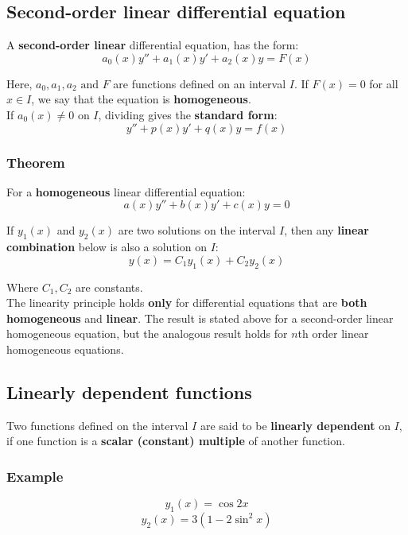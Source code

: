 \documentclass[11pt]{article}
\begin{document}
\newpage

\subsection{Second-order linear differential equation}
\label{sec:org2d5abe5}
A \textbf{second-order linear} differential equation, has the form:
\[a_0(x)y'' + a_1(x)y' + a_2(x)y = F(x)\]

Here, \(a_0, a_1, a_2 \text{ and } F\) are functions defined on an interval \(I\). If \(F(x) = 0\) for all \(x \in I\), we say that the equation is \textbf{homogeneous}.
\\[0pt]

If \(a_0 (x) \ne 0\) on \(I\), dividing gives the \textbf{standard form}:
\[y'' + p(x)y' + q(x)y = f(x)\]

\subsubsection{Theorem}
\label{sec:org902061b}
For a \textbf{homogeneous} linear differential equation:
\[a(x)y'' + b(x)y' + c(x)y = 0\]

If \(y_1(x)\) and \(y_2(x)\) are two solutions on the interval \(I\), then any \textbf{linear combination} below is also a solution on \(I\):
\[y(x) = C_1 y_1 (x) + C_2 y_2 (x)\]

Where \(C_1, C_2\) are constants.
\\[0pt]

The linearity principle holds \textbf{only} for differential equations that are \textbf{both homogeneous} and \textbf{linear}. The result is stated above for a second-order linear homogeneous equation, but the analogous result holds for \(n\)th order linear homogeneous equations.

\newpage

\subsection{Linearly dependent functions}
\label{sec:org7937d30}
Two functions defined on the interval \(I\) are said to be \textbf{linearly dependent} on \(I\), if one function is a \textbf{scalar (constant) multiple} of another function.

\subsubsection{Example}
\label{sec:org4f48f23}
\[y_1(x) = \cos 2x\]
\[y_2(x) = 3(1 - 2 \sin^2 x)\]
\end{document}
